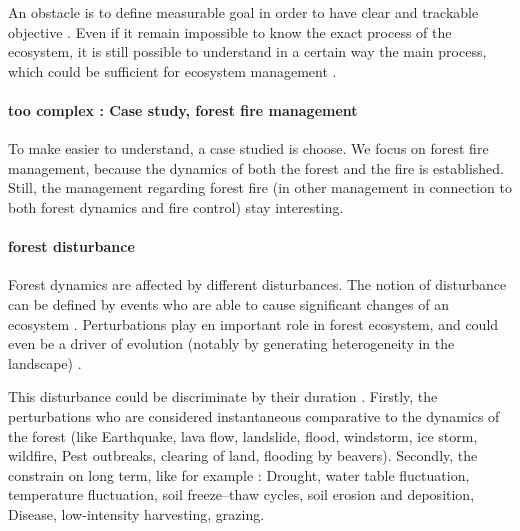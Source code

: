 \documentclass{article}
\begin{document}
An obstacle is to define measurable goal in order to have clear and trackable objective \cite{slocombe1998defining}. Even if it remain impossible to know the exact process of the ecosystem, it is still possible to understand in a certain way the main process, which could be sufficient for ecosystem management \cite{mori2011ecosystem}\cite{slocombe1998defining}\cite{stanley1995ecosystem}. 


\paragraph{too complex : Case study, forest fire management \\}

To make easier to understand, a case studied is choose. We focus on forest fire management, because the dynamics of both the forest and the fire is established. Still, the management regarding forest fire (in other management in connection to both forest dynamics and fire control) stay interesting.




\paragraph{forest disturbance \\}

Forest dynamics are affected by different disturbances. The notion of disturbance can be defined by events who are able to cause significant changes of an ecosystem \cite{white1985natural} \cite{rykiel1985towards}. Perturbations play en important role in forest ecosystem, and could even be a driver of evolution (notably by generating heterogeneity in the landscape) \cite{turner2010disturbance}.

This disturbance could be discriminate by their duration \cite{perera2015simulation}. Firstly, the perturbations who are considered instantaneous comparative to the dynamics of the forest (like Earthquake, lava flow, landslide, flood, windstorm, ice storm, wildfire, Pest outbreaks, clearing of land, flooding by beavers). Secondly, the constrain on long term, like for example : Drought, water table fluctuation, temperature fluctuation, soil freeze–thaw cycles, soil erosion and deposition, Disease, low-intensity harvesting, grazing.
\end{document}

